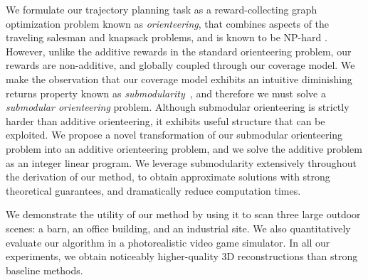 
We formulate our trajectory planning task as a reward-collecting graph optimization problem known as \textit{orienteering}, that combines aspects of the traveling salesman and knapsack problems, and is known to be NP-hard \cite{gunawan:2016,vansteenwegena:2011}.
However, unlike the additive rewards in the standard orienteering problem, our rewards are non-additive, and globally coupled through our coverage model.
We make the observation that our coverage model exhibits an intuitive diminishing returns property known as \textit{submodularity}~\cite{krause:2014}, and therefore we must solve a \textit{submodular orienteering} problem.
Although submodular orienteering is strictly harder than additive orienteering, it exhibits useful structure that can be exploited.
We propose a novel transformation of our submodular orienteering problem into an additive orienteering problem, and we solve the additive problem as an integer linear program. We leverage submodularity extensively throughout the derivation of our method, to obtain approximate solutions with strong theoretical guarantees, and dramatically reduce computation times.

We demonstrate the utility of our method by using it to scan three large outdoor scenes: a barn, an office building, and an industrial site.
We also quantitatively evaluate our algorithm in a photorealistic video game simulator.
In all our experiments, we obtain noticeably higher-quality 3D reconstructions than strong baseline methods.
%


